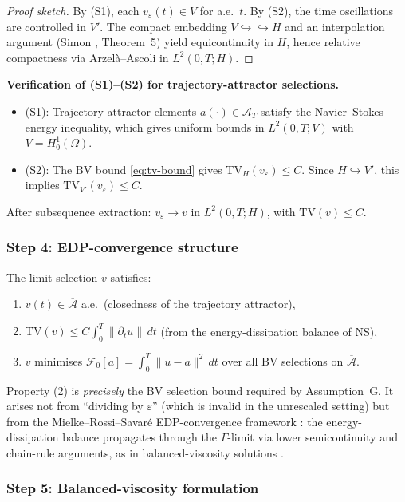 \documentclass[12pt,a4paper]{article}
\theoremstyle{definition}
\theoremstyle{plain}
\theoremstyle{remark}
\begin{document}
\begin{proof}[Proof sketch]
By (S1), each $v_\varepsilon(t) \in V$ for a.e.~$t$. By (S2), the time oscillations are controlled in $V'$. The compact embedding $V \hookrightarrow\!\!\!\hookrightarrow H$ and an interpolation argument (Simon \cite{Simon1987}, Theorem~5) yield equicontinuity in $H$, hence relative compactness via Arzel\`a--Ascoli in $L^2(0,T;H)$.
\end{proof}

\noindent\textbf{Verification of (S1)--(S2) for trajectory-attractor selections.}
\begin{itemize}
\item (S1): Trajectory-attractor elements $a(\cdot) \in \mathcal{A}_T$ satisfy the Navier--Stokes energy inequality, which gives uniform bounds in $L^2(0,T;V)$ with $V = H^1_0(\Omega)$.
\item (S2): The BV bound \eqref{eq:tv-bound} gives $\mathrm{TV}_H(v_\varepsilon) \leq C$. Since $H \hookrightarrow V'$, this implies $\mathrm{TV}_{V'}(v_\varepsilon) \leq C$.
\end{itemize}
After subsequence extraction: $v_\varepsilon \to v$ in $L^2(0,T;H)$, with $\mathrm{TV}(v) \leq C$.

\subsubsection*{Step 4: EDP-convergence structure}

The limit selection $v$ satisfies:
\begin{enumerate}
\item $v(t) \in \overline{\mathcal{A}}$ a.e.\ (closedness of the trajectory attractor),
\item $\mathrm{TV}(v) \leq C \int_0^T \|\partial_t u\| \, dt$ (from the energy-dissipation balance of NS),
\item $v$ minimises $\mathcal{F}_0[a] = \int_0^T \|u - a\|^2\,dt$ over all BV selections on $\overline{\mathcal{A}}$.
\end{enumerate}
Property (2) is \emph{precisely} the BV selection bound required by Assumption~G. It arises not from ``dividing by $\varepsilon$'' (which is invalid in the unrescaled setting) but from the Mielke--Rossi--Savar\'e EDP-convergence framework \cite{MielkeRossiSavare2016}: the energy-dissipation balance propagates through the $\Gamma$-limit via lower semicontinuity and chain-rule arguments, as in balanced-viscosity solutions \cite{MielkeRossiSavare2016}.

\subsubsection*{Step 5: Balanced-viscosity formulation}
\end{document}

